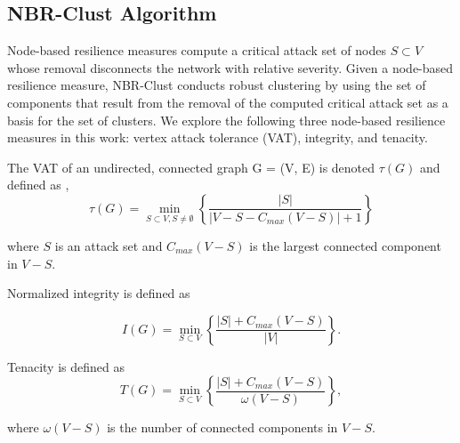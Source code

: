 \documentclass{bmcart}
\begin{document}
\subsection*{NBR-Clust Algorithm}

Node-based resilience measures compute a critical attack set of nodes $S \subset V$ whose removal disconnects the network with relative severity.  
Given a node-based resilience measure, NBR-Clust conducts robust clustering by using the set of components that result from the removal of the computed critical attack set as a basis for the set of clusters.  
We explore the following three node-based resilience measures in this work: vertex attack tolerance (VAT), integrity, and tenacity.

The VAT of an undirected, connected graph G = (V, E) is denoted $\tau(G)$ and defined as \cite{spectralVAT}, \cite{matta2017vertex}
\begin{equation}
\tau(G) = \min_{S \subset V, S \neq \emptyset} \left\{\frac{|S|}{|V-S-C_{max}(V-S)|+1 } \right\} 
\end{equation}

where $S$ is an attack set and $C_{max}(V-S)$ is the largest connected component in $V-S$. 


Normalized integrity \cite{Barefoot1987} is defined as

\begin{equation}
I(G) = \min_{S \subset V} \left\{ \frac{|S|  + C_{max}(V-S)}{|V|} \right\}.
\end{equation}

Tenacity \cite{Cozzens1995} is defined as \begin{equation}
T(G) = \min_{S \subset V}\left\{\frac{|S|+C_{max}(V-S)}{\omega (V-S)}\right\},
\end{equation} 

where $\omega (V-S)$ is the number of connected components in $V-S$.  
\end{document}
